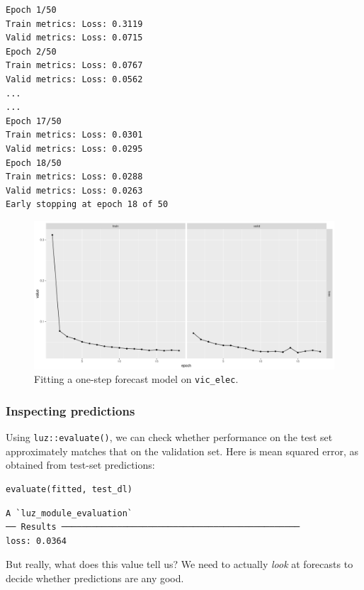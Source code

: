\documentclass[
  letterpaper,
]{krantz}
\begin{document}
\begin{verbatim}
Epoch 1/50
Train metrics: Loss: 0.3119
Valid metrics: Loss: 0.0715
Epoch 2/50
Train metrics: Loss: 0.0767
Valid metrics: Loss: 0.0562
...
...
Epoch 17/50
Train metrics: Loss: 0.0301
Valid metrics: Loss: 0.0295
Epoch 18/50
Train metrics: Loss: 0.0288 
Valid metrics: Loss: 0.0263
Early stopping at epoch 18 of 50
\end{verbatim}

\begin{figure}[H]

{\centering \includegraphics{images/timeseries-vic-elec-fit.png}

}

\caption{\label{fig-timeseries-vic-elec-fit}Fitting a one-step forecast
model on \texttt{vic\_elec}.}

\end{figure}

\hypertarget{inspecting-predictions}{%
\subsubsection{Inspecting predictions}\label{inspecting-predictions}}

Using \texttt{luz::evaluate()}, we can check whether performance on the
test set approximately matches that on the validation set. Here is mean
squared error, as obtained from test-set predictions:

\begin{verbatim}
evaluate(fitted, test_dl)
\end{verbatim}

\begin{verbatim}
A `luz_module_evaluation`
── Results ───────────────────────────────────────────────
loss: 0.0364
\end{verbatim}

But really, what does this value tell us? We need to actually
\emph{look} at forecasts to decide whether predictions are any good.
\end{document}
